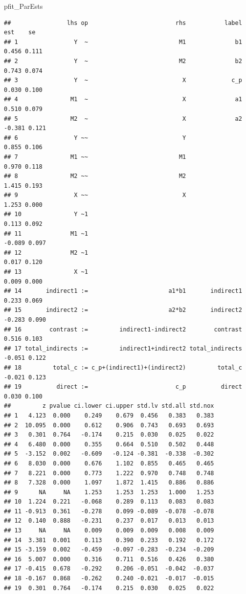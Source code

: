 \documentclass[
  11pt,
]{book}
\newenvironment{Shaded}{\begin{snugshade}}{\end{snugshade}}
\newcommand{\NormalTok}[1]{#1}
\begin{document}
\begin{Shaded}
\begin{Highlighting}[]
\NormalTok{pfit\_ParEsts}
\end{Highlighting}
\end{Shaded}

\begin{verbatim}
##                lhs op                         rhs           label    est    se
## 1                Y  ~                          M1              b1  0.456 0.111
## 2                Y  ~                          M2              b2  0.743 0.074
## 3                Y  ~                           X             c_p  0.030 0.100
## 4               M1  ~                           X              a1  0.510 0.079
## 5               M2  ~                           X              a2 -0.381 0.121
## 6                Y ~~                           Y                  0.855 0.106
## 7               M1 ~~                          M1                  0.970 0.118
## 8               M2 ~~                          M2                  1.415 0.193
## 9                X ~~                           X                  1.253 0.000
## 10               Y ~1                                              0.113 0.092
## 11              M1 ~1                                             -0.089 0.097
## 12              M2 ~1                                              0.017 0.120
## 13               X ~1                                              0.009 0.000
## 14       indirect1 :=                       a1*b1       indirect1  0.233 0.069
## 15       indirect2 :=                       a2*b2       indirect2 -0.283 0.090
## 16        contrast :=         indirect1-indirect2        contrast  0.516 0.103
## 17 total_indirects :=         indirect1+indirect2 total_indirects -0.051 0.122
## 18         total_c := c_p+(indirect1)+(indirect2)         total_c -0.021 0.123
## 19          direct :=                         c_p          direct  0.030 0.100
##         z pvalue ci.lower ci.upper std.lv std.all std.nox
## 1   4.123  0.000    0.249    0.679  0.456   0.383   0.383
## 2  10.095  0.000    0.612    0.906  0.743   0.693   0.693
## 3   0.301  0.764   -0.174    0.215  0.030   0.025   0.022
## 4   6.480  0.000    0.355    0.664  0.510   0.502   0.448
## 5  -3.152  0.002   -0.609   -0.124 -0.381  -0.338  -0.302
## 6   8.030  0.000    0.676    1.102  0.855   0.465   0.465
## 7   8.221  0.000    0.773    1.222  0.970   0.748   0.748
## 8   7.328  0.000    1.097    1.872  1.415   0.886   0.886
## 9      NA     NA    1.253    1.253  1.253   1.000   1.253
## 10  1.224  0.221   -0.068    0.289  0.113   0.083   0.083
## 11 -0.913  0.361   -0.278    0.099 -0.089  -0.078  -0.078
## 12  0.140  0.888   -0.231    0.237  0.017   0.013   0.013
## 13     NA     NA    0.009    0.009  0.009   0.008   0.009
## 14  3.381  0.001    0.113    0.390  0.233   0.192   0.172
## 15 -3.159  0.002   -0.459   -0.097 -0.283  -0.234  -0.209
## 16  5.007  0.000    0.316    0.711  0.516   0.426   0.380
## 17 -0.415  0.678   -0.292    0.206 -0.051  -0.042  -0.037
## 18 -0.167  0.868   -0.262    0.240 -0.021  -0.017  -0.015
## 19  0.301  0.764   -0.174    0.215  0.030   0.025   0.022
\end{verbatim}
\end{document}
